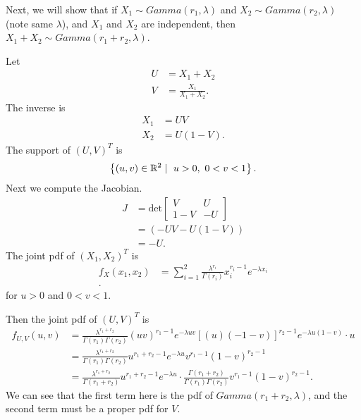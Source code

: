 
Next, we will show that if $X_1 \sim Gamma\left( r_1, \lambda \right) $ and $X_2 \sim Gamma\left( r_2, \lambda \right) $ (note same $\lambda$), and $X_1$ and $X_2$ are independent, then $X_1 + X_2 \sim Gamma\left( r_1 + r_2 , \lambda \right) $.

Let 
\begin{align*}
	U &= X_1 + X_2 \\
	V &= \frac{X_1}{X_1 + X_2}
.\end{align*}
The inverse is 
\begin{align*}
	X_1 &= UV \\
	X_2 &= U\left( 1 - V \right) 
.\end{align*}
The support of $\left( U, V \right) ^{T}$ is 
\[
	\left\{ \left( u, v \right) \in  \mathbb{R} ^2  \mid \ u > 0 ,\ 0 < v < 1 \right\} 
.\] 
Next we compute the Jacobian. 
\begin{align*}
	J &= \text{det}\begin{bmatrix} 
	V & U \\
1 - V & -U \end{bmatrix}  \\
      &= \left( -UV - U\left( 1 - V \right)  \right)  \\
      &= -U 
.\end{align*}
The joint pdf of $\left( X_1, X_2 \right) ^{T}$ is 
\begin{align*}
	f_{X}\left( x_1, x_2 \right) &= \sum_{i=1}^{2} \frac{\lambda^{r_i}}{\Gamma\left( r_i \right) }x_i^{r_i - 1}e^{-\lambda x_i} \\
.\end{align*}
for $u>0$ and $0<v<1$.

Then the joint pdf of $\left( U, V \right) ^{T}$ is 
\begin{align*}
	f_{U, V}\left( u, v \right) &= \frac{\lambda^{r_1 + r_2}}{\Gamma\left( r_1 \right) \Gamma\left( r_2 \right) }\left( uv \right) ^{r_1 - 1}e ^{-\lambda uv} \left[ \left( u \right) \left( -1-v \right)  \right] ^{r_2 - 1} e ^{-\lambda u \left( 1 - v \right) } \cdot u \\
				    &= \frac{\lambda^{r_1 + r_2}}{\Gamma\left( r_1 \right) \Gamma\left( r_2 \right) } u ^{r_1 + r_2 - 1}e ^{-\lambda u}  v  ^{r_1 - 1} \left( 1 - v \right) ^{r_2 - 1} \\
				    &= \frac{\lambda^{r_1 + r_2}}{\Gamma\left( r_1 + r_2 \right)  } u ^{r_1 + r_2 - 1}e ^{-\lambda u} \cdot \frac{\Gamma\left( r_1 + r_2 \right) }{\Gamma\left( r_1 \right) \Gamma\left( r_2 \right) }v  ^{r_1 - 1} \left( 1 - v \right) ^{r_2 - 1} 
.\end{align*}
We can see that the first term here is the pdf of $Gamma\left( r_1 + r_2, \lambda \right) $, and the second term must be a proper pdf for $V$.

